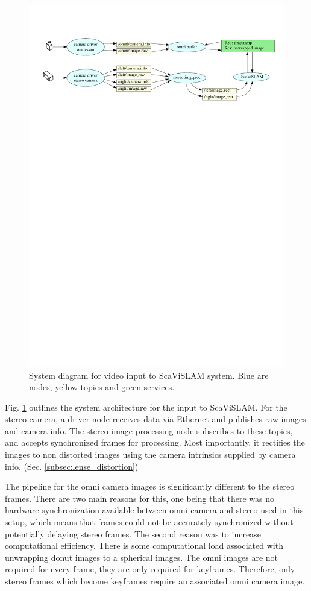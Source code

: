 \begin{figure}[H]
  \centering
    \includegraphics[width=1.1\textwidth]{chapters/images/input_architecture}
  \caption{System diagram for video input to ScaViSLAM system.  Blue are nodes, yellow topics and green services.}
  \label{fig:input_architecture}
\end{figure}

Fig. \ref{fig:input_architecture} outlines the system architecture for the input to ScaViSLAM.  For the stereo camera, a driver node receives data via Ethernet and publishes raw images and camera info.  The stereo image processing node subscribes to these topics, and accepts synchronized frames for processing.  Most importantly, it rectifies the images to non distorted images using the camera intrinsics supplied by camera info. (Sec. \ref{subsec:lense_distortion}) 

The pipeline for the omni camera images is significantly different to the stereo frames.  There are two main reasons for this, one being that there was no hardware synchronization available between omni camera and stereo used in this setup, which means that frames could not be accurately synchronized without potentially delaying stereo frames.  The second reason was to increase computational efficiency.  There is some computational load associated with unwrapping donut images to a spherical images.  The omni images are not required for every frame, they are only required for keyframes.  Therefore, only stereo frames which become keyframes require an associated omni camera image.

